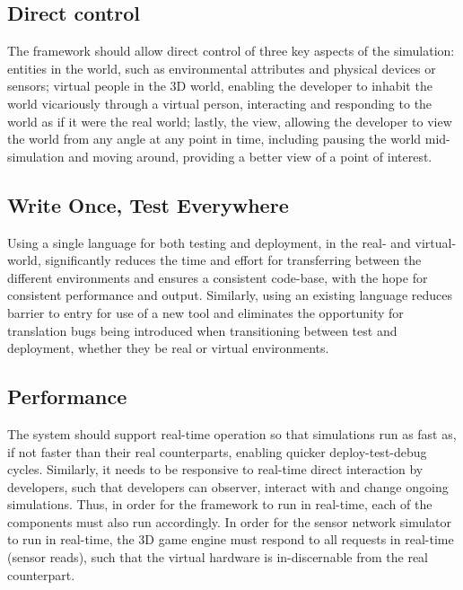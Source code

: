 
\subsection{Direct control}
\label{sub:requirements_direct_control}
The framework should allow direct control of three key aspects of the simulation: entities in the world, such as environmental attributes and physical devices or sensors; virtual people in the 3D world, enabling the developer to inhabit the world vicariously through a virtual person, interacting and responding to the world as if it were the real world; lastly, the view, allowing the developer to view the world from any angle at any point in time, including pausing the world mid-simulation and moving around, providing a better view of a point of interest.

\subsection{Write Once, Test Everywhere}
\label{sub:requirements_real_code}
Using a single language for both testing and deployment, in the real- and virtual-world, significantly reduces the time and effort for transferring between the different environments and ensures a consistent code-base, with the hope for consistent performance and output. Similarly, using an existing language reduces barrier to entry for use of a new tool and eliminates the opportunity for translation bugs being introduced when transitioning between test and deployment, whether they be real or virtual environments.

\subsection{Performance}
\label{sub:requirements_real-time_operation}
The system should support real-time operation so that simulations run as fast as, if not faster than their real counterparts, enabling quicker deploy-test-debug cycles. Similarly, it needs to be responsive to real-time direct interaction by developers, such that developers can observer, interact with and change ongoing simulations. Thus, in order for the framework to run in real-time, each of the components must also run accordingly. In order for the sensor network simulator to run in real-time, the 3D game engine must respond to all requests in real-time (sensor reads), such that the virtual hardware is in-discernable from the real counterpart.


